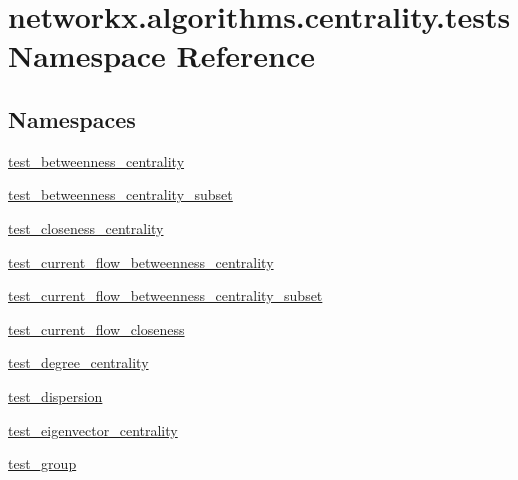 \hypertarget{namespacenetworkx_1_1algorithms_1_1centrality_1_1tests}{}\section{networkx.\+algorithms.\+centrality.\+tests Namespace Reference}
\label{namespacenetworkx_1_1algorithms_1_1centrality_1_1tests}
\subsection*{Namespaces}
\begin{DoxyCompactItemize}
\item 
 \hyperlink{namespacenetworkx_1_1algorithms_1_1centrality_1_1tests_1_1test__betweenness__centrality}{test\+\_\+betweenness\+\_\+centrality}
\item 
 \hyperlink{namespacenetworkx_1_1algorithms_1_1centrality_1_1tests_1_1test__betweenness__centrality__subset}{test\+\_\+betweenness\+\_\+centrality\+\_\+subset}
\item 
 \hyperlink{namespacenetworkx_1_1algorithms_1_1centrality_1_1tests_1_1test__closeness__centrality}{test\+\_\+closeness\+\_\+centrality}
\item 
 \hyperlink{namespacenetworkx_1_1algorithms_1_1centrality_1_1tests_1_1test__current__flow__betweenness__centrality}{test\+\_\+current\+\_\+flow\+\_\+betweenness\+\_\+centrality}
\item 
 \hyperlink{namespacenetworkx_1_1algorithms_1_1centrality_1_1tests_1_1test__current__flow__betweenness__centrality__subset}{test\+\_\+current\+\_\+flow\+\_\+betweenness\+\_\+centrality\+\_\+subset}
\item 
 \hyperlink{namespacenetworkx_1_1algorithms_1_1centrality_1_1tests_1_1test__current__flow__closeness}{test\+\_\+current\+\_\+flow\+\_\+closeness}
\item 
 \hyperlink{namespacenetworkx_1_1algorithms_1_1centrality_1_1tests_1_1test__degree__centrality}{test\+\_\+degree\+\_\+centrality}
\item 
 \hyperlink{namespacenetworkx_1_1algorithms_1_1centrality_1_1tests_1_1test__dispersion}{test\+\_\+dispersion}
\item 
 \hyperlink{namespacenetworkx_1_1algorithms_1_1centrality_1_1tests_1_1test__eigenvector__centrality}{test\+\_\+eigenvector\+\_\+centrality}
\item 
 \hyperlink{namespacenetworkx_1_1algorithms_1_1centrality_1_1tests_1_1test__group}{test\+\_\+group}

\end{DoxyCompactItemize}
